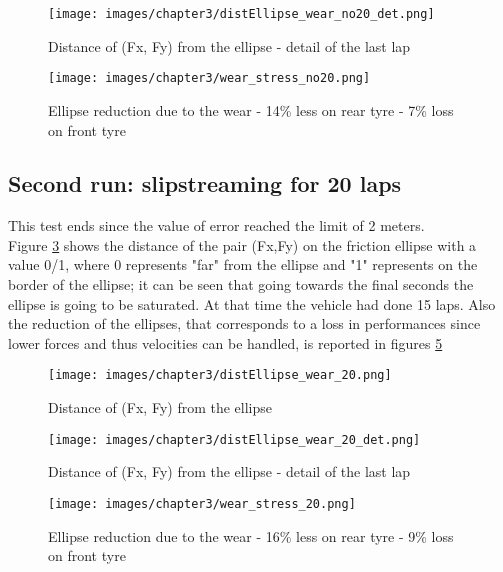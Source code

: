 \documentclass{report}
\let\Oldsubsection\subsection
\renewcommand{\subsection}{\FloatBarrier\Oldsubsection}
\begin{document}
\begin{figure}[h!]
    \centering
    \texttt{[image: images/chapter3/distEllipse\_wear\_no20\_det.png]}
    \caption{Distance of (Fx, Fy) from the ellipse - detail of the last lap}
    \label{fig:res_distEllipse_stressNo20_det}
\end{figure}

\begin{figure}[h!]
    \centering
    \texttt{[image: images/chapter3/wear\_stress\_no20.png]}
    \caption{Ellipse reduction due to the wear - 14\% less on rear tyre - 7\% loss on front tyre}
    \label{fig:res_wear_stressNo20}
\end{figure}

\subsection{Second run: slipstreaming for 20 laps}
This test ends since the value of error reached the limit of 2 meters. \\Figure \ref{fig:res_distEllipse_stress20} shows the distance of the pair (Fx,Fy) on the friction ellipse with a value 0/1, where 0 represents "far" from the ellipse and "1" represents on the border of the ellipse; it can be seen that going towards the final seconds the ellipse is going to be saturated. At that time the vehicle had done 15 laps. Also the reduction of the ellipses, that corresponds to a loss in performances since lower forces and thus velocities can be handled, is reported in figures \ref{fig:res_wear_stress20}

\begin{figure}[h!]
    \centering
    \texttt{[image: images/chapter3/distEllipse\_wear\_20.png]}
    \caption{Distance of (Fx, Fy) from the ellipse}
    \label{fig:res_distEllipse_stress20}
\end{figure}

\begin{figure}[h!]
    \centering
    \texttt{[image: images/chapter3/distEllipse\_wear\_20\_det.png]}
    \caption{Distance of (Fx, Fy) from the ellipse - detail of the last lap}
    \label{fig:res_distEllipse_stress20_det}
\end{figure}

\begin{figure}[h!]
    \centering
    \texttt{[image: images/chapter3/wear\_stress\_20.png]}
    \caption{Ellipse reduction due to the wear - 16\% less on rear tyre - 9\% loss on front tyre}
    \label{fig:res_wear_stress20}
\end{figure}
\end{document}
